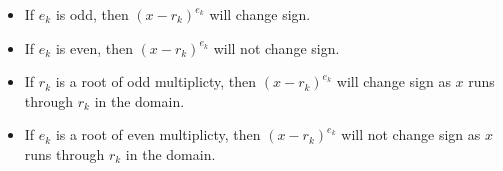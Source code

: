 \documentclass{ximera}
\begin{document}
\begin{itemize}
\item If $e_k$ is odd, then $(x-r_k)^{e_k}$ will change sign.
\item If $e_k$ is even, then $(x-r_k)^{e_k}$ will not change sign.
\end{itemize}







\begin{itemize}
\item If $r_k$ is a root of odd multiplicty, then $(x-r_k)^{e_k}$ will change sign as $x$ runs through $r_k$ in the domain.
\item If $e_k$ is a root of even multiplicty, then $(x-r_k)^{e_k}$ will not change sign as $x$ runs through $r_k$ in the domain.
\end{itemize}
\end{document}
